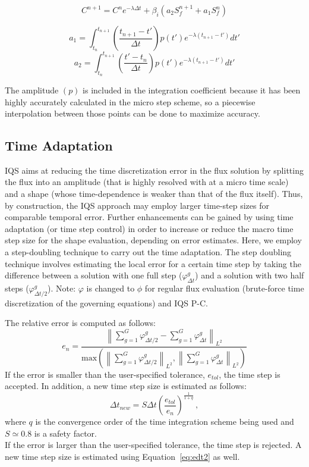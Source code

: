 \documentclass[12pt]{scrartcl}
\newcommand{\norm}[1]{\left\lVert#1\right\rVert_{L^2}}
\newcommand{\eqt}[1]{Equation~\ref{#1}}                     %
\newcommand{\be}{\begin{equation}}
\newcommand{\ee}{\end{equation}}
\begin{document}
\be
C^{n+1} = C^n e^{-\lambda \Delta t} 
+ \beta_i \left(a_2 S_f^{n+1} + a_1 S_f^{n}\right)
\label{eq:c_dis}
\ee

\be
a_1 = \int_{t_n}^{t_{n+1}}\left(\frac{t_{n+1}-t'}{\Delta t}\right)p(t')e^{-\lambda(t_{n+1}-t')}dt'
\label{eq:a1}
\ee
\be
a_2 = \int_{t_n}^{t_{n+1}}\left(\frac{t'-t_n}{\Delta t}\right)p(t')e^{-\lambda(t_{n+1}-t')}dt'
\label{eq:a2}
\ee

The amplitude $(p)$ is included in the integration coefficient because it has been highly accurately calculated in the micro step scheme, so a piecewise interpolation between those points can be done to maximize accuracy.  


\subsection{Time Adaptation}
\label{sect:dt2}

IQS aims at reducing the time discretization error in the flux solution by splitting the flux into an amplitude (that is highly resolved with at a micro time scale) and a shape (whose time-dependence is weaker than that of the flux itself). Thus, by construction, the IQS approach may employ larger time-step sizes for comparable temporal error. Further enhancements can be gained by using time adaptation (or time step control) in order to increase or reduce the macro time step size for the
shape evaluation, depending on error estimates. Here, we employ a step-doubling technique to carry out the time adaptation.
The step doubling technique involves estimating the local error for a certain time step by taking the difference between a solution with one full step ($\varphi^g_{\Delta t}$) and a solution with two half steps ($\varphi^g_{\Delta t/2}$). Note:
$\varphi$ is changed to $\phi$ for regular flux evaluation (brute-force time discretization of the governing equations) and IQS P-C.

The relative error is computed as follows:
\be
e_n = \frac{\norm{\sum_{g=1}^G\varphi^g_{\Delta t/2} - \sum_{g=1}^G\varphi^g_{\Delta t}}}{\text{max}\left(\norm{\sum_{g=1}^G\varphi^g_{\Delta t/2}},\norm{\sum_{g=1}^G\varphi^g_{\Delta t}}\right)}
\label{eq:edt2}
\ee
If the error is smaller than the user-specified tolerance, $e_{tol}$, the time step is accepted. In addition, a new time step size is estimated as follows:
\be
\Delta t_{new} = S \Delta t \left(\frac{e_{tol}}{e_n}\right)^{\frac{1}{1+q}} \,,
\label{eq:dt2}
\ee
where $q$ is the convergence order of the time integration scheme being used and $S\simeq 0.8$ is a safety factor.\\
If the error is larger than the user-specified tolerance, the time step is rejected. A new time step size is estimated using  \eqt{eq:edt2} as well.
\end{document}
